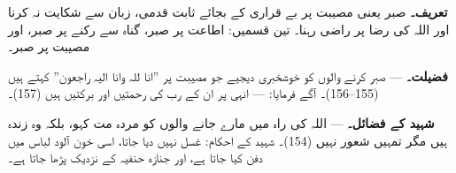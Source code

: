 \begin{hal}

\smallskip
\textbf{تعریف۔} صبر یعنی مصیبت پر بے قراری کے بجائے ثابت قدمی، زبان سے
شکایت نہ کرنا اور اللہ کی رضا پر راضی رہنا۔ تین قسمیں: اطاعت پر صبر، گناہ سے
رکنے پر صبر، اور مصیبت پر صبر۔

\medskip
\textbf{فضیلت۔}  ---
صبر کرنے والوں کو خوشخبری دیجیے جو مصیبت پر ''انا للہ وانا الیہ راجعون''
کہتے ہیں (\textenglish{155--156})۔ آگے فرمایا:  --- انہی پر ان کے رب کی رحمتیں اور
برکتیں ہیں (\textenglish{157})۔

\medskip
\textbf{شہید کے فضائل۔}  --- اللہ کی راہ
میں مارے جانے والوں کو مردہ مت کہو، بلکہ وہ زندہ ہیں مگر تمہیں شعور نہیں
(\textenglish{154})۔ شہید کے احکام: غسل نہیں دیا جاتا، اسی خون آلود لباس میں
دفن کیا جاتا ہے، اور جنازہ حنفیہ کے نزدیک پڑھا جاتا ہے۔
\end{hal}
